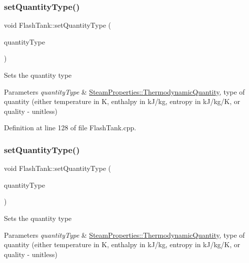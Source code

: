 \subsubsection{\texorpdfstring{set\+Quantity\+Type()}{setQuantityType()}\hspace{0.1cm}{\footnotesize\ttfamily [2/3]}}
{\footnotesize\ttfamily void Flash\+Tank\+::set\+Quantity\+Type (\begin{DoxyParamCaption}\item[{\hyperlink{class_steam_properties_ae0294bedf7d178c2d8fb6aed0f62fbff}{Steam\+Properties\+::\+Thermodynamic\+Quantity}}]{quantity\+Type }\end{DoxyParamCaption})}

Sets the quantity type 
\begin{DoxyParams}{Parameters}
{\em quantity\+Type} & \hyperlink{class_steam_properties_ae0294bedf7d178c2d8fb6aed0f62fbff}{Steam\+Properties\+::\+Thermodynamic\+Quantity}, type of quantity (either temperature in K, enthalpy in k\+J/kg, entropy in k\+J/kg/K, or quality -\/ unitless) \\
\hline
\end{DoxyParams}


Definition at line 128 of file Flash\+Tank.\+cpp.

\mbox{\label{class_flash_tank_a30aa7a42d1547f61b176da4a15e8e8ee}} 
\subsubsection{\texorpdfstring{set\+Quantity\+Type()}{setQuantityType()}\hspace{0.1cm}{\footnotesize\ttfamily [3/3]}}
{\footnotesize\ttfamily void Flash\+Tank\+::set\+Quantity\+Type (\begin{DoxyParamCaption}\item[{\hyperlink{class_steam_properties_ae0294bedf7d178c2d8fb6aed0f62fbff}{Steam\+Properties\+::\+Thermodynamic\+Quantity}}]{quantity\+Type }\end{DoxyParamCaption})}

Sets the quantity type 
\begin{DoxyParams}{Parameters}
{\em quantity\+Type} & \hyperlink{class_steam_properties_ae0294bedf7d178c2d8fb6aed0f62fbff}{Steam\+Properties\+::\+Thermodynamic\+Quantity}, type of quantity (either temperature in K, enthalpy in k\+J/kg, entropy in k\+J/kg/K, or quality -\/ unitless) \\
\hline
\end{DoxyParams}
\mbox{\label{class_flash_tank_ac7392743aeaf8de6ce368814ea42e236}} 
